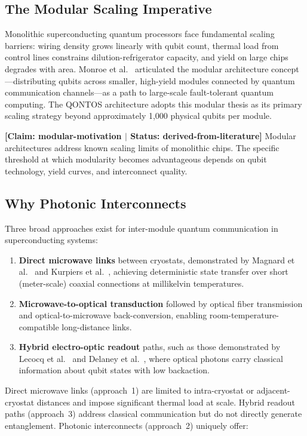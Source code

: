 \documentclass[conference]{IEEEtran}
\begin{document}
\subsection{The Modular Scaling Imperative}

Monolithic superconducting quantum processors face fundamental scaling barriers: wiring density grows linearly with qubit count, thermal load from control lines constrains dilution-refrigerator capacity, and yield on large chips degrades with area. Monroe et al.~\cite{Monroe2014} articulated the modular architecture concept---distributing qubits across smaller, high-yield modules connected by quantum communication channels---as a path to large-scale fault-tolerant quantum computing. The QONTOS architecture adopts this modular thesis as its primary scaling strategy beyond approximately 1,000 physical qubits per module.

\textbf{[Claim: modular-motivation $|$ Status: derived-from-literature]} Modular architectures address known scaling limits of monolithic chips. The specific threshold at which modularity becomes advantageous depends on qubit technology, yield curves, and interconnect quality.

\subsection{Why Photonic Interconnects}

Three broad approaches exist for inter-module quantum communication in superconducting systems:

\begin{enumerate}
\item \textbf{Direct microwave links} between cryostats, demonstrated by Magnard et al.~\cite{Magnard2020} and Kurpiers et al.~\cite{Kurpiers2018}, achieving deterministic state transfer over short (meter-scale) coaxial connections at millikelvin temperatures.
\item \textbf{Microwave-to-optical transduction} followed by optical fiber transmission and optical-to-microwave back-conversion, enabling room-temperature-compatible long-distance links.
\item \textbf{Hybrid electro-optic readout} paths, such as those demonstrated by Lecocq et al.~\cite{Lecocq2021} and Delaney et al.~\cite{Delaney2022}, where optical photons carry classical information about qubit states with low backaction.
\end{enumerate}

Direct microwave links (approach~1) are limited to intra-cryostat or adjacent-cryostat distances and impose significant thermal load at scale. Hybrid readout paths (approach~3) address classical communication but do not directly generate entanglement. Photonic interconnects (approach~2) uniquely offer:
\end{document}
